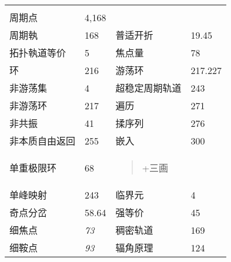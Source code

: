 \begin{longtable}[]{@{}llll@{}}
\begin{minipage}[t]{0.22\columnwidth}
\strut
\end{minipage}\tabularnewline
周期点 & 4,168 & &\tabularnewline
周期執 & 168 & 普适开折 & 19.45\tabularnewline
拓扑執道等价 & 5 & 焦点量 & 78\tabularnewline
环 & 216 & 游荡环 & 217.227\tabularnewline
非游荡集 & 4 & 超稳定周期轨道 & 243\tabularnewline
非游荡环 & 217 & 遍历 & 271\tabularnewline
非共振 & 41 & 揉序列 & 276\tabularnewline
非本质自由返回 & 255 & 嵌入 & 300\tabularnewline
\begin{minipage}[t]{0.22\columnwidth}\raggedright
单重极限环\strut
\end{minipage} & \begin{minipage}[t]{0.22\columnwidth}\raggedright
68\strut
\end{minipage} & \begin{minipage}[t]{0.22\columnwidth}\raggedright
\begin{quote}
+三画
\end{quote}\strut
\end{minipage} & \begin{minipage}[t]{0.22\columnwidth}\raggedright
\strut
\end{minipage}\tabularnewline
单峰映射 & 243 & 临界元 & 4\tabularnewline
奇点分岔 & 58.64 & 强等价 & 45\tabularnewline
细焦点 & \emph{73} & 稠密轨道 & 169\tabularnewline
细鞍点 & \emph{93} & 辐角原理 & 124\tabularnewline
\bottomrule
\end{longtable}

